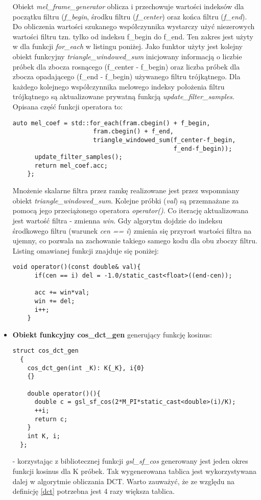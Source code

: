 \begin{itemize}
Obiekt \textit{mel\_frame\_generator} oblicza i przechowuje wartości indeksów dla początku filtru (\textit{f\_begin}, środku filtru (\textit{f\_center}) oraz końca filtru (\textit{f\_end}). Do obliczenia wartości szukanego współczynnika wystarczy użyć niezerowych wartości filtru tzn. tylko od indeksu f\_begin do f\_end. Ten zakres jest użyty w dla funkcji \textit{for\_each} w listingu poniżej. Jako funktor użyty jest kolejny obiekt funkcyjny \textit{triangle\_windowed\_sum} inicjowany informacją
o liczbie próbek dla zbocza rosnącego (f\_center - f\_begin) oraz liczba próbek dla zbocza opadającego (f\_end - f\_begin) używanego filtru trójkątnego. Dla każdego kolejnego współczynnika melowego indeksy położenia filtru trójkątnego są aktualizowane prywatną funkcją \textit{update\_filter\_samples}. Opisana część funkcji operatora to: 
 \begin{lstlisting}[style=lst:cpp]
      auto mel_coef = std::for_each(fram.cbegin() + f_begin,
                      fram.cbegin() + f_end,
                      triangle_windowed_sum(f_center-f_begin,
                                            f_end-f_begin));
      update_filter_samples();
      return mel_coef.acc;
    };
 \end{lstlisting}

 Mnożenie skalarne filtra przez ramkę realizowane jest przez wspomniany obiekt \textit{triangle\_windowed\_sum}. Kolejne próbki (\textit{val}) są przemnażane za pomocą jego przeciążonego operatora \textit{operator()}. Co iterację aktualizowana jest wartość filtra - zmienna \textit{win}. Gdy algorytm dojdzie do indeksu środkowego filtru (warunek \textit{cen == i}) zmienia się przyrost wartości filtra na ujemny, co pozwala na zachowanie takiego samego kodu dla obu zboczy filtru. Listing omawianej funkcji znajduje się poniżej:
 \begin{lstlisting}[style=lst:cpp]
    void operator()(const double& val){
      if(cen == i) del = -1.0/static_cast<float>((end-cen));

      acc += win*val;
      win += del;
      i++;
    }
 \end{lstlisting}

\item{\textbf{Obiekt funkcyjny cos\_dct\_gen} generujący funkcję kosinus:
 \begin{lstlisting}[style=lst:cpp]
  struct cos_dct_gen
  {
    cos_dct_gen(int _K): K{_K}, i{0}
    {}

    double operator()(){
      double c = gsl_sf_cos(2*M_PI*static_cast<double>(i)/K);
      ++i;
      return c;
    }
    int K, i;
  };
\end{lstlisting}
}
- korzystając z bibliotecznej funkcji \textit{gsl\_sf\_cos} generowany jest jeden okres funkcji kosinus dla K próbek. Tak wygenerowana tablica jest wykorzystywana dalej w algorytmie obliczania DCT. Warto zauważyć, że ze względu na definicję {\ref{dct}} potrzebna jest 4 razy większa tablica.



\end{itemize}
